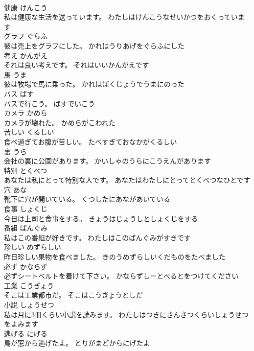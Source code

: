\documentclass[8pt]{extreport}
\begin{document}
\begin{CJK}{UTF8}{min}
\\	健康	けんこう	
\\	私は健康な生活を送っています。	わたしはけんこうなせいかつをおくっています	
\\	グラフ	ぐらふ	
\\	彼は売上をグラフにした。	かれはうりあげをぐらふにした	
\\	考え	かんがえ	
\\	それは良い考えです。	それはいいかんがえです	
\\	馬	うま	
\\	彼は牧場で馬に乗った。	かれはぼくじょうでうまにのった	
\\	バス	ばす	
\\	バスで行こう。	ばすでいこう	
\\	カメラ	かめら	
\\	カメラが壊れた。	かめらがこわれた	
\\	苦しい	くるしい	
\\	食べ過ぎてお腹が苦しい。	たべすぎておなかがくるしい	
\\	裏	うら	
\\	会社の裏に公園があります。	かいしゃのうらにこうえんがあります	
\\	特別	とくべつ	
\\	あなたは私にとって特別な人です。	あなたはわたしにとってとくべつなひとです	
\\	穴	あな	
\\	靴下に穴が開いている。	くつしたにあながあいている	
\\	食事	しょくじ	
\\	今日は上司と食事をする。	きょうはじょうしとしょくじをする	
\\	番組	ばんぐみ	
\\	私はこの番組が好きです。	わたしはこのばんぐみがすきです	
\\	珍しい	めずらしい	
\\	昨日珍しい果物を食べました。	きのうめずらしいくだものをたべました	
\\	必ず	かならず	
\\	必ずシートベルトを着けて下さい。	かならずしーとべるとをつけてください	
\\	工業	こうぎょう	
\\	そこは工業都市だ。	そこはこうぎょうとしだ	
\\	小説	しょうせつ	
\\	私は月に3冊くらい小説を読みます。	わたしはつきにさんさつくらいしょうせつをよみます	
\\	逃げる	にげる	
\\	鳥が窓から逃げたよ。	とりがまどからにげたよ	

\end{CJK}
\end{document}
